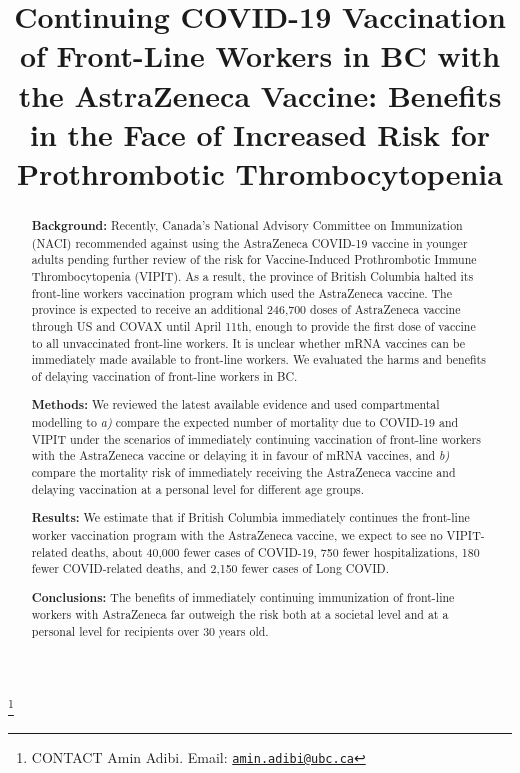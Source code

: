 \documentclass[]{interact}
\theoremstyle{plain}%
\theoremstyle{definition}
\theoremstyle{remark}
\begin{document}

\title{Continuing COVID-19 Vaccination of Front-Line Workers in BC with
the AstraZeneca Vaccine: Benefits in the Face of Increased Risk for
Prothrombotic Thrombocytopenia}


\author{
}

\thanks{CONTACT Amin
Adibi. Email: \href{mailto:amin.adibi@ubc.ca}{\nolinkurl{amin.adibi@ubc.ca}}}

\maketitle

\begin{abstract}
\textbf{Background:} Recently, Canada's National Advisory Committee on
Immunization (NACI) recommended against using the AstraZeneca COVID-19
vaccine in younger adults pending further review of the risk for
Vaccine-Induced Prothrombotic Immune Thrombocytopenia (VIPIT). As a
result, the province of British Columbia halted its front-line workers
vaccination program which used the AstraZeneca vaccine. The province is
expected to receive an additional 246,700 doses of AstraZeneca vaccine
through US and COVAX until April 11th, enough to provide the first dose
of vaccine to all unvaccinated front-line workers. It is unclear whether
mRNA vaccines can be immediately made available to front-line workers.
We evaluated the harms and benefits of delaying vaccination of
front-line workers in BC.

\textbf{Methods:} We reviewed the latest available evidence and used
compartmental modelling to \emph{a)} compare the expected number of
mortality due to COVID-19 and VIPIT under the scenarios of immediately
continuing vaccination of front-line workers with the AstraZeneca
vaccine or delaying it in favour of mRNA vaccines, and \emph{b)} compare
the mortality risk of immediately receiving the AstraZeneca vaccine and
delaying vaccination at a personal level for different age groups.

\textbf{Results:} We estimate that if British Columbia immediately
continues the front-line worker vaccination program with the AstraZeneca
vaccine, we expect to see no VIPIT-related deaths, about 40,000 fewer
cases of COVID-19, 750 fewer hospitalizations, 180 fewer COVID-related
deaths, and 2,150 fewer cases of Long COVID.

\textbf{Conclusions:} The benefits of immediately continuing
immunization of front-line workers with AstraZeneca far outweigh the
risk both at a societal level and at a personal level for recipients
over 30 years old.
\end{abstract}
\end{document}
